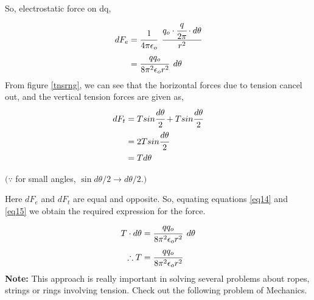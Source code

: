So, electrostatic force on dq, 
\begin{align}
    dF_e &= \cfrac{1}{4 \pi \epsilon_o} \hspace{5pt} \cfrac{q_o\cdot \cfrac{q}{2 \pi}\cdot d\theta}{r^2}\nonumber\\
    &= \cfrac{qq_o}{8\pi^2\epsilon_or^2}\hspace{5pt}d\theta \label{eq14}
\end{align}
From figure \ref{tnsrng}, we can see that the horizontal forces due to tension cancel out, and the vertical tension forces are given as,
\begin{align}
    dF_t &= T sin\cfrac{d\theta}{2} + T sin\cfrac{d\theta}{2}\nonumber\\
    &= 2T sin\cfrac{d\theta}{2}\nonumber\\
    &= Td\theta \label{eq15}
\end{align}
\begin{center}
$\big(\because$ for small angles, $\sin d\theta/2 \to d\theta/2.\big)$ \\
\end{center}
\vspace{5pt}
Here $dF_e$ and $dF_t$ are equal and opposite. So, equating equations \ref{eq14} and \ref{eq15} we obtain the required expression for the force.
\begin{align*}
    T\cdot d\theta &= \cfrac{qq_o}{8\pi^2\epsilon_or^2}\hspace{5pt}d\theta\\
    \therefore T &= \cfrac{qq_o}{8\pi^2\epsilon_or^2}
\end{align*}
\textbf{Note:} This approach is really important in solving several problems about ropes, strings or rings involving tension. Check out the following problem of Mechanics.
\pagebreak
